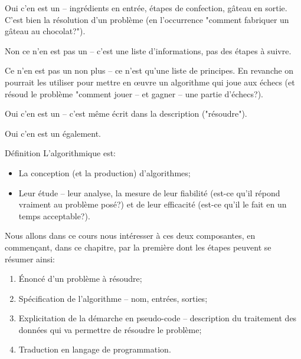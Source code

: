 \documentclass[12pt]{article}
\begin{document}
	\begin{MaReponse}
		\begin{alphenum}
			\item Oui c'en est un -- ingrédients en entrée, étapes de confection, gâteau en sortie. C'est bien la résolution d'un problème (en l'occurrence "comment fabriquer un gâteau au chocolat?").
			\item Non ce n'en est pas un -- c'est une liste d'informations, pas des étapes à suivre.
			\item Ce n'en est pas un non plus -- ce n'est qu'une liste de principes. En revanche on pourrait les utiliser pour mettre en \oe{}uvre un algorithme qui joue aux échecs (et résoud le problème "comment jouer -- et gagner -- une partie d'échecs?).
			\item Oui c'en est un -- c'est même écrit dans la description ("résoudre").
			\item Oui c'en est un également.
		\end{alphenum}
	\end{MaReponse}
	
	\begin{MonAmp}{Définition}
		L'algorithmique est:
		\begin{itemize}
			\item La conception (et la production) d'algorithmes;
			\item Leur étude -- leur analyse, la mesure de leur fiabilité (est-ce qu'il répond vraiment au problème posé?) et de leur efficacité (est-ce qu'il le fait en un temps acceptable?).
		\end{itemize}
	\end{MonAmp}
	
	Nous allons dans ce cours nous intéresser à ces deux composantes, en commençant, dans ce chapitre, par la première dont les étapes peuvent se résumer ainsi:
	\begin{enumerate}
		\item Énoncé d'un problème à résoudre;
		\item Spécification de l'algorithme -- nom, entrées, sorties;
		\item Explicitation de la démarche en pseudo-code -- description du traitement des données qui va permettre de résoudre le problème;
		\item Traduction en langage de programmation.
	\end{enumerate}
	
\end{document}
